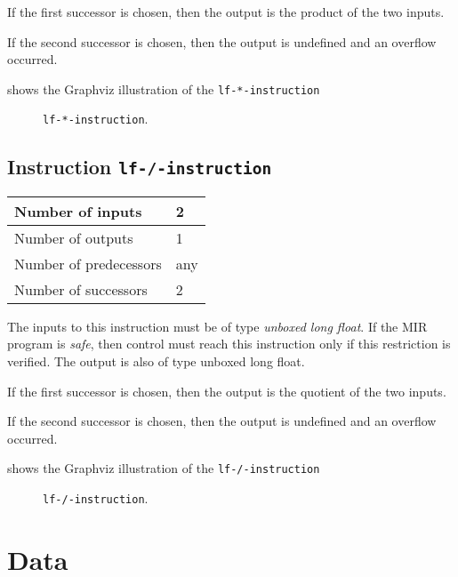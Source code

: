 If the first successor is chosen, then the output is
the product of the two inputs.  

If the second successor is chosen, then the output is undefined and an
overflow occurred. 

 shows the Graphviz illustration of the
\texttt{lf-*-instruction}

\begin{figure}
\begin{center}
\end{center}
\caption{\label{fig-lf-*-instruction}
\texttt{lf-*-instruction}.}
\end{figure}

\subsection{Instruction \texttt{lf-/-instruction}}
\label{mir-instruction-lf-/}

\begin{tabular}{|l|l|}
\hline
Number of inputs & 2\\
\hline
Number of outputs & 1\\
\hline
Number of predecessors & any\\
\hline
Number of successors & 2\\
\hline
\end{tabular}

The inputs to this instruction must be of type \emph{unboxed long
  float}.  If the MIR program is \emph{safe}, then control must reach
this instruction only if this restriction is verified.  The output is
also of type unboxed long float.

If the first successor is chosen, then the output is
the quotient of the two inputs.  

If the second successor is chosen, then the output is undefined and an
overflow occurred. 

 shows the Graphviz illustration of the
\texttt{lf-/-instruction}

\begin{figure}
\begin{center}
\end{center}
\caption{\label{fig-lf-/-instruction}
\texttt{lf-/-instruction}.}
\end{figure}

\section{Data}

